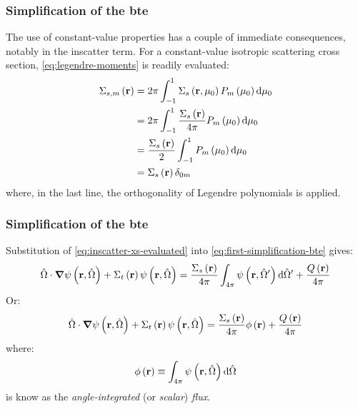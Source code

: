 \begin{frame}
  \frametitle{Simplification of the \gls{bte}}
  The use of constant-value properties has a couple of immediate consequences, notably in the inscatter term.
  For a constant-value isotropic scattering cross section, \cref{eq:legendre-moments} is readily evaluated:
  \begin{equation}\label{eq:inscatter-xs-evaluated}
    \begin{split}
      \Sigma_{s,m}\left(\mathbf{r}\right) & = 2\pi \int_{-1}^{1}\Sigma_s \left(\mathbf{r},\mu_0\right)P_m \left(\mu_0\right)\dd \mu_0       \\
      & =2\pi \int_{-1}^{1}\frac{\Sigma_s\left(\mathbf{r}\right)}{4\pi} P_m \left(\mu_0\right)\dd \mu_0 \\
      & =\frac{\Sigma_s\left(\mathbf{r}\right)}{2}\int_{-1}^{1} P_m \left(\mu_0\right)\dd \mu_0         \\
      & =\Sigma_s\left(\mathbf{r}\right) \delta_{0m}
    \end{split}
  \end{equation}
  where, in the last line, the orthogonality of Legendre polynomials is applied.

\end{frame}

\begin{frame}
  \frametitle{Simplification of the \gls{bte}}
  Substitution of \cref{eq:inscatter-xs-evaluated} into \cref{eq:first-simplification-bte} gives:
  \begin{equation}
    \hat{\Omega} \cdot \grad \psi\left(\mathbf{r},\hat{\Omega}\right) + \Sigma_t \left(\mathbf{r}\right)\psi\left(\mathbf{r},\hat{\Omega}\right) =\frac{\Sigma_s\left(\mathbf{r}\right)}{4\pi}\int_{4\pi}\psi \left(\mathbf{r},\hat{\Omega}'\right) \dd \hat{\Omega}' + \frac{Q\left(\mathbf{r}\right)}{4\pi}
  \end{equation}
  Or:
  \begin{equation} \label{eq:fully-simplified-bte-repeated}
    \hat{\Omega} \cdot \grad \psi\left(\mathbf{r},\hat{\Omega}\right) + \Sigma_t \left(\mathbf{r}\right)\psi\left(\mathbf{r},\hat{\Omega}\right) =\frac{\Sigma_s\left(\mathbf{r}\right)}{4\pi}\phi\left(\mathbf{r}\right) + \frac{Q\left(\mathbf{r}\right)}{4\pi}
  \end{equation}
  where:
  \begin{equation}
    \label{eq:scalar-flux-repeated}
    \phi\left(\mathbf{r}\right)\equiv \int_{4\pi}\psi \left(\mathbf{r},\hat{\Omega}\right) \dd \hat{\Omega}
  \end{equation}
   is know as the \textit{angle-integrated} (or \textit{scalar}) \textit{flux}.
\end{frame}